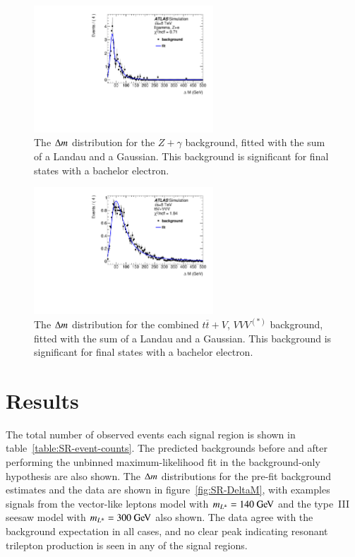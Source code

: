 \begin{figure}[htbp]
\centering
   \includegraphics[width=0.6\textwidth]{figures/resonance/fit_llgamma_Ze.pdf}
  \caption{The $\Delta m$ distribution for the $Z+\gamma$ background, fitted with the sum of a Landau and a Gaussian. This background is significant for final states with a bachelor electron.} 
  \label{fig:eegamma}
\end{figure} 


\begin{figure}[htbp]
\centering
   \includegraphics[width=0.6\textwidth]{figures/resonance/fit_ttV_VVV.pdf}
  \caption{The $\Delta m$ distribution for the combined  $t\overline{t}+V$, $VVV^{(*)}$  background, fitted with the sum of a Landau and a Gaussian. This background is significant for final states with a bachelor electron.} 
  \label{fig:ttV}
\end{figure} 


\clearpage


\section{Results}\label{sec:resonance-results}

The total number of observed events each signal region is shown in table~\ref{table:SR-event-counts}. The predicted backgrounds before and after performing the unbinned maximum-likelihood fit in the background-only hypothesis are also shown. The $\Delta m$ distributions for the pre-fit background estimates and the data are shown in figure~\ref{fig:SR-DeltaM}, with examples signals from the vector-like leptons model with $m_{\lpm}=140 \GeV$ and the type~III seesaw model with $m_{\lpm}=300 \GeV$ also shown. The data agree with the background expectation in all cases, and no clear peak indicating resonant trilepton production is seen in any of the signal regions. 

